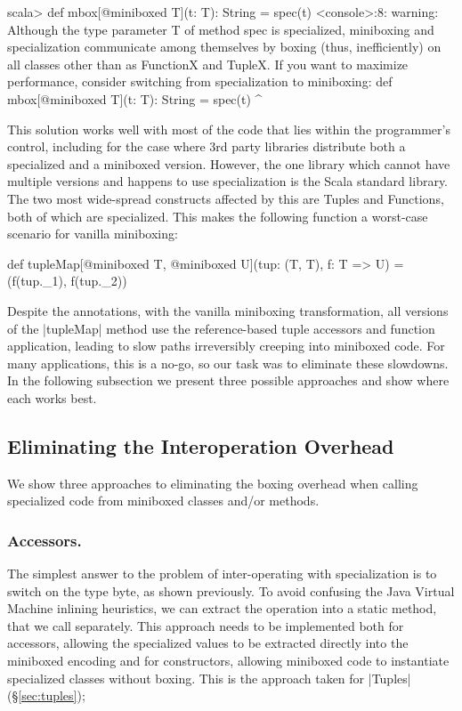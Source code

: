 \begin{lstlisting-nobreak-nolang}
scala>  def mbox[@miniboxed T](t: T): String = spec(t)
<console>:8: warning: Although the type parameter T of method spec is specialized, miniboxing and specialization communicate among themselves by boxing (thus, inefficiently) on all classes other than as FunctionX and TupleX. If you want to maximize performance, consider switching from specialization to miniboxing:
        def mbox[@miniboxed T](t: T): String = spec(t)
                                                            ^
\end{lstlisting-nobreak-nolang}

This solution works well with most of the code that lies within the programmer's control, including for the case where 3rd party libraries distribute both a specialized and a miniboxed version. However, the one library which cannot have multiple versions and happens to use specialization is the Scala standard library. The two most wide-spread constructs affected by this are Tuples and Functions, both of which are specialized. This makes the following function a worst-case scenario for vanilla miniboxing:

\begin{lstlisting-nobreak}
 def tupleMap[@miniboxed T,
                  @miniboxed U](tup: (T, T), f: T => U) =
   (f(tup._1), f(tup._2))
\end{lstlisting-nobreak}

Despite the annotations, with the vanilla miniboxing transformation, all versions of the |tupleMap| method use the reference-based tuple accessors and function application, leading to slow paths irreversibly creeping into miniboxed code. For many applications, this is a no-go, so our task was to eliminate these slowdowns. In the following subsection we present three possible approaches and show where each works best.

\subsection{Eliminating the Interoperation Overhead}

We show three approaches to eliminating the boxing overhead when calling specialized code from miniboxed classes and/or methods.

\subsubsection{Accessors.} The simplest answer to the problem of inter-operating with specialization is to switch on the type byte, as shown previously. To avoid confusing the Java Virtual Machine inlining heuristics, we can extract the operation into a static method, that we call separately. This approach needs to be implemented both for accessors, allowing the specialized values to be extracted directly into the miniboxed encoding and for constructors, allowing miniboxed code to instantiate specialized classes without boxing. This is the approach taken for |Tuples| (\S\ref{sec:tuples});

